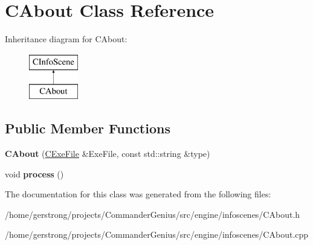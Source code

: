 \hypertarget{class_c_about}{
\section{CAbout Class Reference}
\label{class_c_about}
}
Inheritance diagram for CAbout:\begin{figure}[H]
\begin{center}
\leavevmode
\includegraphics[height=2cm]{class_c_about}
\end{center}
\end{figure}
\subsection*{Public Member Functions}
\begin{DoxyCompactItemize}
\item 
\hypertarget{class_c_about_ad3ae78aba1bfdc51cb81774b3ea85b25}{
{\bfseries CAbout} (\hyperlink{class_c_exe_file}{CExeFile} \&ExeFile, const std::string \&type)}
\label{class_c_about_ad3ae78aba1bfdc51cb81774b3ea85b25}

\item 
\hypertarget{class_c_about_a34a2d846aed6e9eabb0f217073ce4e96}{
void {\bfseries process} ()}
\label{class_c_about_a34a2d846aed6e9eabb0f217073ce4e96}

\end{DoxyCompactItemize}


The documentation for this class was generated from the following files:\begin{DoxyCompactItemize}
\item 
/home/gerstrong/projects/CommanderGenius/src/engine/infoscenes/CAbout.h\item 
/home/gerstrong/projects/CommanderGenius/src/engine/infoscenes/CAbout.cpp\end{DoxyCompactItemize}
